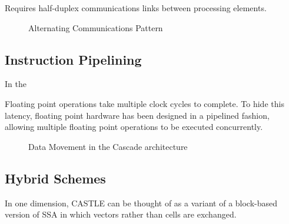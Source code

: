 Requires half-duplex communications links between processing elements.
\begin{figure}
  \centering
  
  \caption{Alternating Communications Pattern}
  \label{fig:alternatingcomms}
\end{figure}

\subsection{Instruction Pipelining}

In the 


Floating point operations take multiple clock cycles to complete.
To hide this latency, floating point hardware has been designed in a pipelined fashion, allowing multiple floating point operations to be executed concurrently.


\begin{figure}
  \centering
  
  \caption{Data Movement in the Cascade architecture}
  \label{fig:cascade_placement}
\end{figure}








\subsection{Hybrid Schemes}
In one dimension, CASTLE can be thought of as a variant of a block-based version of SSA in which vectors rather than cells are exchanged.
